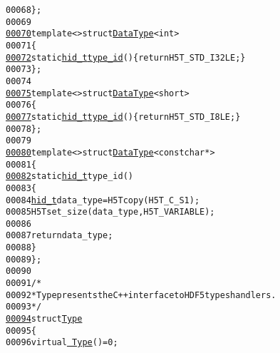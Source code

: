 \begin{footnotesize}
\begin{alltt}
00068         \};
00069 
\hypertarget{hdf5_8hh_source_l00070}{}\hyperlink{structeos_1_1hdf5_1_1DataType_3_01int_01_4}{00070}         \textcolor{keyword}{template} <> \textcolor{keyword}{struct }\hyperlink{structeos_1_1hdf5_1_1DataType}{DataType}<int>
00071         \{
\hypertarget{hdf5_8hh_source_l00072}{}\hyperlink{structeos_1_1hdf5_1_1DataType_3_01int_01_4_ad6b7bc5e9e4745f8a02fa6ceeaa110ba}{00072}             \textcolor{keyword}{static} \hyperlink{namespaceeos_1_1hdf5_a5bd5e209f1bf36cdc5551465dacf2e74}{hid_t} \hyperlink{structeos_1_1hdf5_1_1DataType_3_01int_01_4_ad6b7bc5e9e4745f8a02fa6ceeaa110ba}{type_id}() \{ \textcolor{keywordflow}{return} H5T\_STD\_I32LE; \}
00073         \};
00074 
\hypertarget{hdf5_8hh_source_l00075}{}\hyperlink{structeos_1_1hdf5_1_1DataType_3_01short_01_4}{00075}         \textcolor{keyword}{template} <> \textcolor{keyword}{struct }\hyperlink{structeos_1_1hdf5_1_1DataType}{DataType}<short>
00076         \{
\hypertarget{hdf5_8hh_source_l00077}{}\hyperlink{structeos_1_1hdf5_1_1DataType_3_01short_01_4_aff06c6712c9e5f6c29c77de87a238d59}{00077}             \textcolor{keyword}{static} \hyperlink{namespaceeos_1_1hdf5_a5bd5e209f1bf36cdc5551465dacf2e74}{hid_t} \hyperlink{structeos_1_1hdf5_1_1DataType_3_01short_01_4_aff06c6712c9e5f6c29c77de87a238d59}{type_id}() \{ \textcolor{keywordflow}{return} H5T\_STD\_I8LE; \}
00078         \};
00079 
\hypertarget{hdf5_8hh_source_l00080}{}\hyperlink{structeos_1_1hdf5_1_1DataType_3_01const_01char_01_5_01_4}{00080}         \textcolor{keyword}{template} <> \textcolor{keyword}{struct }\hyperlink{structeos_1_1hdf5_1_1DataType}{DataType}<const char *>
00081         \{
\hypertarget{hdf5_8hh_source_l00082}{}\hyperlink{structeos_1_1hdf5_1_1DataType_3_01const_01char_01_5_01_4_a917f76dfdee14b398ac9514608c24937}{00082}             \textcolor{keyword}{static} \hyperlink{namespaceeos_1_1hdf5_a5bd5e209f1bf36cdc5551465dacf2e74}{hid_t} type\_id()
00083             \{
00084                 \hyperlink{namespaceeos_1_1hdf5_a5bd5e209f1bf36cdc5551465dacf2e74}{hid_t} data\_type = H5Tcopy(H5T\_C\_S1);
00085                 H5Tset\_size(data\_type, H5T\_VARIABLE);
00086 
00087                 \textcolor{keywordflow}{return} data\_type;
00088             \}
00089         \};
00090 
00091         \textcolor{comment}{/*}
00092 \textcolor{comment}{         * Type presents the C++ interface to HDF5 types handlers.}
00093 \textcolor{comment}{         */}
\hypertarget{hdf5_8hh_source_l00094}{}\hyperlink{structeos_1_1hdf5_1_1Type}{00094}         \textcolor{keyword}{struct }\hyperlink{structeos_1_1hdf5_1_1Type}{Type}
00095         \{
00096             \textcolor{keyword}{virtual} \hyperlink{structeos_1_1hdf5_1_1Type_a0c9013a37b76efb7538829c3e14d0162}{~Type}() = 0;

\end{alltt}
\end{footnotesize}
